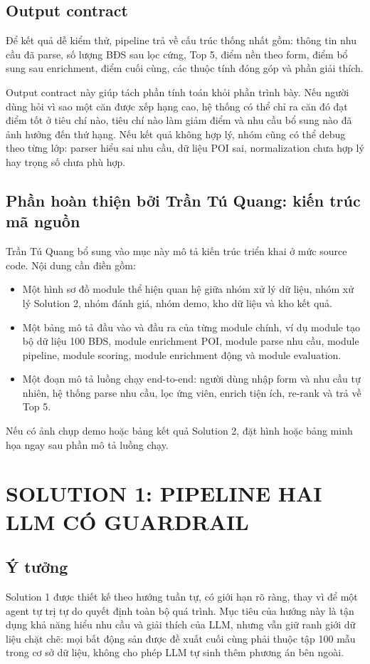 \documentclass[a4paper,12pt]{article}
\begin{document}
\subsection{Output contract}
Để kết quả dễ kiểm thử, pipeline trả về cấu trúc thống nhất gồm: thông tin nhu cầu đã parse, số lượng BĐS sau lọc cứng, Top 5, điểm nền theo form, điểm bổ sung sau enrichment, điểm cuối cùng, các thuộc tính đóng góp và phần giải thích.

Output contract này giúp tách phần tính toán khỏi phần trình bày. Nếu người dùng hỏi vì sao một căn được xếp hạng cao, hệ thống có thể chỉ ra căn đó đạt điểm tốt ở tiêu chí nào, tiêu chí nào làm giảm điểm và nhu cầu bổ sung nào đã ảnh hưởng đến thứ hạng. Nếu kết quả không hợp lý, nhóm cũng có thể debug theo từng lớp: parser hiểu sai nhu cầu, dữ liệu POI sai, normalization chưa hợp lý hay trọng số chưa phù hợp.

\subsection{Phần hoàn thiện bởi Trần Tú Quang: kiến trúc mã nguồn}
Trần Tú Quang bổ sung vào mục này mô tả kiến trúc triển khai ở mức source code. Nội dung cần điền gồm:

\begin{itemize}
    \item Một hình sơ đồ module thể hiện quan hệ giữa nhóm xử lý dữ liệu, nhóm xử lý Solution 2, nhóm đánh giá, nhóm demo, kho dữ liệu và kho kết quả.
    \item Một bảng mô tả đầu vào và đầu ra của từng module chính, ví dụ module tạo bộ dữ liệu 100 BĐS, module enrichment POI, module parse nhu cầu, module pipeline, module scoring, module enrichment động và module evaluation.
    \item Một đoạn mô tả luồng chạy end-to-end: người dùng nhập form và nhu cầu tự nhiên, hệ thống parse nhu cầu, lọc ứng viên, enrich tiện ích, re-rank và trả về Top 5.
\end{itemize}

Nếu có ảnh chụp demo hoặc bảng kết quả Solution 2, đặt hình hoặc bảng minh họa ngay sau phần mô tả luồng chạy.

\section{SOLUTION 1: PIPELINE HAI LLM CÓ GUARDRAIL}

\subsection{Ý tưởng}
Solution 1 được thiết kế theo hướng tuần tự, có giới hạn rõ ràng, thay vì để một agent tự trị tự do quyết định toàn bộ quá trình. Mục tiêu của hướng này là tận dụng khả năng hiểu nhu cầu và giải thích của LLM, nhưng vẫn giữ ranh giới dữ liệu chặt chẽ: mọi bất động sản được đề xuất cuối cùng phải thuộc tập 100 mẫu trong cơ sở dữ liệu, không cho phép LLM tự sinh thêm phương án bên ngoài.
\end{document}
